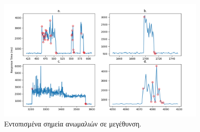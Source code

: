 \begin{figure}
	\centering
	\includegraphics[width=0.9\textwidth]{./images/chapter4/timeseries_repad2_experiment_subplots.png}
	\caption[Εντοπισμένα σημεία ανωμαλιών σε μεγέθυνση.]{Εντοπισμένα σημεία ανωμαλιών σε μεγέθυνση.}
	\label{fig:repad2_experiments_subplots}
\end{figure}
